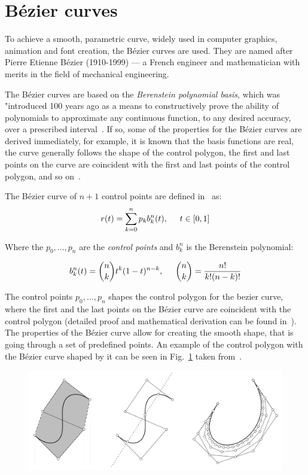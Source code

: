 \section{Bézier curves}\label{sec:bezier-curves}
To achieve a smooth, parametric curve, widely used in computer graphics, animation and font creation, the Bézier curves are used.
They are named after Pierre Etienne Bézier (1910-1999) --- a French engineer and mathematician with merits in the field of mechanical engineering.

The Bézier curves are based on the \textit{Berenstein polynomial basis}, which was "introduced 100 years ago as a means to constructively prove the ability of polynomials to approximate any continuous function, to any desired accuracy, over a prescribed interval~\cite{farouki2012bernstein}.
If so, some of the properties for the Bézier curves are derived immediately, for example, it is known that the basis functions are real, the curve generally follows the shape of the control polygon, the first and last points on the curve are coincident with the first and last points of the control polygon, and so on~\cite{bezier-curves}.

The Bézier curve of $n+1$ control points are defined in~\cite{farouki2012bernstein} as:
\[
    r(t) = \sum_{k=0}^n p_k b_k^n(t),  \hspace{5mm} t \in [0,1]
\]

Where the $p_0,\dots,p_n$ are the \textit{control points} and $b_k^n$ is the Berenstein polynomial:

\[
    b_k^n(t) = \binom{n}{k} t^k (1-t)^{n-k}, \hspace{5mm} \binom{n}{k} = \frac{n!}{k!(n-k)!}
\]

The control points $p_0,\dots,p_n$ shapes the control polygon for the bezier curve, where the first and the last points on the Bézier curve are coincident with the control polygon (detailed proof and mathematical derivation can be found in~\cite{farouki2012bernstein}).
The properties of the Bézier curve allow for creating the smooth shape, that is going through a set of predefined points.
An example of the control polygon with the Bézier curve shaped by it can be seen in Fig.~\ref{fig:bezier-example} taken from~\cite{farouki2012bernstein}.

\begin{figure}[hbt!]
    \centering
    \includegraphics[width=0.6\linewidth]{resources/bezier-curves-example.png}
    \label{fig:bezier-example}
\end{figure}